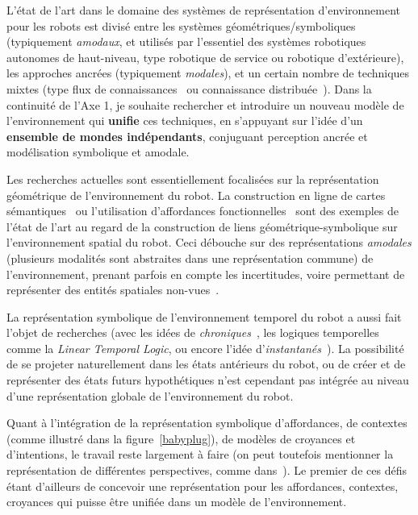 \documentclass[a4paper]{article}
\begin{document}
L'état de l'art dans le domaine des systèmes de représentation d'environnement
pour les robots est divisé entre les systèmes géométriques/symboliques
(typiquement \emph{amodaux}, et utilisés par l'essentiel des systèmes robotiques
autonomes de haut-niveau, type robotique de service ou robotique d'extérieure),
les approches ancrées (typiquement \emph{modales}), et un certain nombre de
techniques mixtes (type flux de connaissances~\cite{heintz2004dyknow} ou
connaissance distribuée~\cite{hawes2007balt}). Dans la continuité de l'Axe 1, je
souhaite rechercher et introduire un nouveau modèle de l'environnement qui
\textbf{unifie} ces techniques, en s'appuyant sur l'idée d'un \textbf{ensemble
de mondes indépendants}, conjuguant perception ancrée et modélisation symbolique
et amodale.

Les recherches actuelles sont essentiellement focalisées sur la représentation
géométrique de l'environnement du robot. La construction en ligne de cartes
sémantiques~\cite{Nuechter2008, Galindo2008, Blodow2011} ou l'utilisation
d'affordances fonctionnelles~\cite{Varadarajan2011} sont des exemples de l'état
de l'art au regard de la construction de liens géométrique-symbolique sur
l'environnement spatial du robot. Ceci débouche sur des représentations
\emph{amodales} (plusieurs modalités sont abstraites dans une représentation
commune) de l'environnement, prenant parfois en compte les incertitudes, voire
permettant de représenter des entités spatiales non-vues~\cite{Mavridis2006}.

La représentation symbolique de l'environnement temporel du robot a aussi fait
l'objet de recherches (avec les idées de \emph{chroniques}~\cite{Ghallab1996},
les logiques temporelles comme la \emph{Linear Temporal Logic}, ou encore
l'idée d'\emph{instantanés}~\cite{Mavridis2006}).  La possibilité de se projeter
naturellement dans les états antérieurs du robot, ou de créer et de représenter
des états futurs hypothétiques n'est cependant pas intégrée au niveau d'une
représentation globale de l'environnement du robot.

Quant à l'intégration de la représentation symbolique d'affordances, de
contextes (comme illustré dans la figure~\ref{babyplug}), de modèles de
croyances et d'intentions, le travail reste largement à faire (on peut toutefois
mentionner la représentation de différentes perspectives, comme
dans~\cite{ros2010which}). Le premier de ces défis étant d'ailleurs de concevoir
une représentation pour les affordances, contextes, croyances qui
puisse être unifiée dans un modèle de l'environnement.
\end{document}
